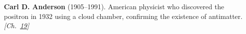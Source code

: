 \nobelphysics \textbf{Carl D. Anderson} (1905–1991). American physicist who discovered the positron in 1932 using a cloud chamber, confirming the existence of antimatter. \emph{[Ch.~\hyperref[ch:cosmicraymuons]{19}]}

